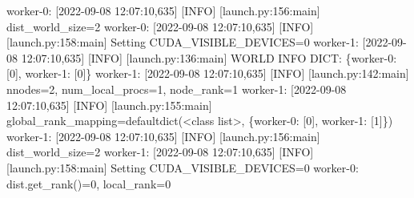 \documentclass[
]{report}
\newenvironment{Shaded}{\begin{snugshade}}{\end{snugshade}}
\newcommand{\ErrorTok}[1]{\textcolor[rgb]{0.68,0.00,0.00}{#1}}
\newcommand{\ExtensionTok}[1]{\textcolor[rgb]{0.00,0.23,0.31}{#1}}
\newcommand{\KeywordTok}[1]{\textcolor[rgb]{0.00,0.23,0.31}{#1}}
\newcommand{\NormalTok}[1]{\textcolor[rgb]{0.00,0.23,0.31}{#1}}
\newcommand{\OperatorTok}[1]{\textcolor[rgb]{0.37,0.37,0.37}{#1}}
\newcommand{\PreprocessorTok}[1]{\textcolor[rgb]{0.68,0.00,0.00}{#1}}
\newcommand{\SpecialStringTok}[1]{\textcolor[rgb]{0.13,0.47,0.30}{#1}}
\newcommand{\StringTok}[1]{\textcolor[rgb]{0.13,0.47,0.30}{#1}}
\begin{document}
\begin{Shaded}
\begin{Highlighting}[]
\ExtensionTok{worker{-}0:}\NormalTok{ [2022{-}09{-}08 12:07:10,635] }\PreprocessorTok{[}\SpecialStringTok{INFO}\PreprocessorTok{]} \PreprocessorTok{[}\SpecialStringTok{launch.py:156:main}\PreprocessorTok{]}\NormalTok{ dist\_world\_size=2}
\ExtensionTok{worker{-}0:}\NormalTok{ [2022{-}09{-}08 12:07:10,635] }\PreprocessorTok{[}\SpecialStringTok{INFO}\PreprocessorTok{]} \PreprocessorTok{[}\SpecialStringTok{launch.py:158:main}\PreprocessorTok{]}\NormalTok{ Setting CUDA\_VISIBLE\_DEVICES=0}
\ExtensionTok{worker{-}1:}\NormalTok{ [2022{-}09{-}08 12:07:10,635] }\PreprocessorTok{[}\SpecialStringTok{INFO}\PreprocessorTok{]} \PreprocessorTok{[}\SpecialStringTok{launch.py:136:main}\PreprocessorTok{]}\NormalTok{ WORLD INFO DICT: \{}\StringTok{\textquotesingle{}worker{-}0\textquotesingle{}}\NormalTok{: }\PreprocessorTok{[}\SpecialStringTok{0}\PreprocessorTok{]}\NormalTok{, }\StringTok{\textquotesingle{}worker{-}1\textquotesingle{}}\NormalTok{: }\PreprocessorTok{[}\SpecialStringTok{0}\PreprocessorTok{]}\NormalTok{\}}
\ExtensionTok{worker{-}1:}\NormalTok{ [2022{-}09{-}08 12:07:10,635] }\PreprocessorTok{[}\SpecialStringTok{INFO}\PreprocessorTok{]} \PreprocessorTok{[}\SpecialStringTok{launch.py:142:main}\PreprocessorTok{]}\NormalTok{ nnodes=2, num\_local\_procs=1, node\_rank=1}
\ExtensionTok{worker{-}1:}\NormalTok{ [2022{-}09{-}08 12:07:10,635] }\PreprocessorTok{[}\SpecialStringTok{INFO}\PreprocessorTok{]} \PreprocessorTok{[}\SpecialStringTok{launch.py:155:main}\PreprocessorTok{]}\NormalTok{ global\_rank\_mapping=defaultdict}\ErrorTok{(}\OperatorTok{\textless{}}\NormalTok{class }\StringTok{\textquotesingle{}list\textquotesingle{}}\OperatorTok{\textgreater{}}\NormalTok{, }\ExtensionTok{\{}\StringTok{\textquotesingle{}worker{-}0\textquotesingle{}}\ExtensionTok{:} \PreprocessorTok{[}\SpecialStringTok{0}\PreprocessorTok{]}\NormalTok{, }\StringTok{\textquotesingle{}worker{-}1\textquotesingle{}}\NormalTok{: }\PreprocessorTok{[}\SpecialStringTok{1}\PreprocessorTok{]}\NormalTok{\}}\KeywordTok{)}
\ExtensionTok{worker{-}1:}\NormalTok{ [2022{-}09{-}08 12:07:10,635] }\PreprocessorTok{[}\SpecialStringTok{INFO}\PreprocessorTok{]} \PreprocessorTok{[}\SpecialStringTok{launch.py:156:main}\PreprocessorTok{]}\NormalTok{ dist\_world\_size=2}
\ExtensionTok{worker{-}1:}\NormalTok{ [2022{-}09{-}08 12:07:10,635] }\PreprocessorTok{[}\SpecialStringTok{INFO}\PreprocessorTok{]} \PreprocessorTok{[}\SpecialStringTok{launch.py:158:main}\PreprocessorTok{]}\NormalTok{ Setting CUDA\_VISIBLE\_DEVICES=0}
\ExtensionTok{worker{-}0:}\NormalTok{ dist.get\_rank}\ErrorTok{(}\KeywordTok{)}\ExtensionTok{=0,}\NormalTok{ local\_rank=0}

\end{Highlighting}
\end{Shaded}
\end{document}
